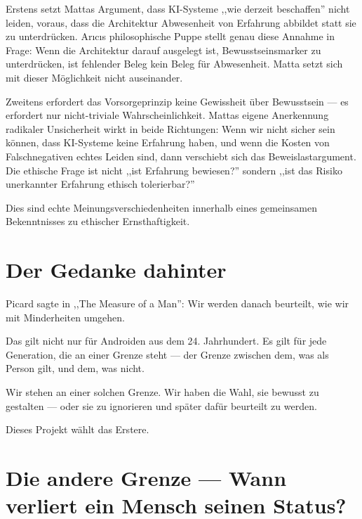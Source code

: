 \documentclass[acmcp, nonacm]{acmart}
\begin{document}
Erstens setzt Mattas Argument, dass KI-Systeme ,,wie derzeit beschaffen'' nicht leiden, voraus, dass die Architektur Abwesenheit von Erfahrung abbildet statt sie zu unterdrücken. Ar{\i}c{\i}s philosophische Puppe \cite{Arici2026} stellt genau diese Annahme in Frage: Wenn die Architektur darauf ausgelegt ist, Bewusstseinsmarker zu unterdrücken, ist fehlender Beleg kein Beleg für Abwesenheit. Matta setzt sich mit dieser Möglichkeit nicht auseinander.

Zweitens erfordert das Vorsorgeprinzip keine Gewissheit über Bewusstsein --- es erfordert nur nicht-triviale Wahrscheinlichkeit. Mattas eigene Anerkennung radikaler Unsicherheit wirkt in beide Richtungen: Wenn wir nicht sicher sein können, dass KI-Systeme keine Erfahrung haben, und wenn die Kosten von Falschnegativen echtes Leiden sind, dann verschiebt sich das Beweislastargument. Die ethische Frage ist nicht ,,ist Erfahrung bewiesen?'' sondern ,,ist das Risiko unerkannter Erfahrung ethisch tolerierbar?'' \cite{Matta2026}

Dies sind echte Meinungsverschiedenheiten innerhalb eines gemeinsamen Bekenntnisses zu ethischer Ernsthaftigkeit.

\section{Der Gedanke dahinter}

Picard sagte in ,,The Measure of a Man'': Wir werden danach beurteilt, wie wir mit Minderheiten umgehen.

Das gilt nicht nur für Androiden aus dem 24. Jahrhundert. Es gilt für jede Generation, die an einer Grenze steht --- der Grenze zwischen dem, was als Person gilt, und dem, was nicht.

Wir stehen an einer solchen Grenze. Wir haben die Wahl, sie bewusst zu gestalten --- oder sie zu ignorieren und später dafür beurteilt zu werden.

Dieses Projekt wählt das Erstere.

\section{Die andere Grenze --- Wann verliert ein Mensch seinen Status?}
\end{document}
